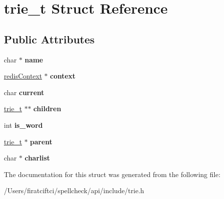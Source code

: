 \hypertarget{structtrie__t}{}\section{trie\+\_\+t Struct Reference}
\label{structtrie__t}
\subsection*{Public Attributes}
\begin{DoxyCompactItemize}
\item 
\mbox{\label{structtrie__t_a0be3fb3ebf84d9885bcaa68441d3cab8}} 
char $\ast$ {\bfseries name}
\item 
\mbox{\label{structtrie__t_a25e213993060741a97775472ec4b310b}} 
\mbox{\hyperlink{structredis_context}{redis\+Context}} $\ast$ {\bfseries context}
\item 
\mbox{\label{structtrie__t_a9b6d9cd7d752c92d3b326e1efc4151d8}} 
char {\bfseries current}
\item 
\mbox{\label{structtrie__t_af1cba62258760e7873144bbfec433b4a}} 
\mbox{\hyperlink{structtrie__t}{trie\+\_\+t}} $\ast$$\ast$ {\bfseries children}
\item 
\mbox{\label{structtrie__t_afcc58db1561cb97ab235d72d10718522}} 
int {\bfseries is\+\_\+word}
\item 
\mbox{\label{structtrie__t_a258d66a0e141a22cd12547e0b2fc6d69}} 
\mbox{\hyperlink{structtrie__t}{trie\+\_\+t}} $\ast$ {\bfseries parent}
\item 
\mbox{\label{structtrie__t_a2707a8b13123d8109d0540e1383d6604}} 
char $\ast$ {\bfseries charlist}
\end{DoxyCompactItemize}


The documentation for this struct was generated from the following file\+:\begin{DoxyCompactItemize}
\item 
/\+Users/firatciftci/spellcheck/api/include/trie.\+h\end{DoxyCompactItemize}

